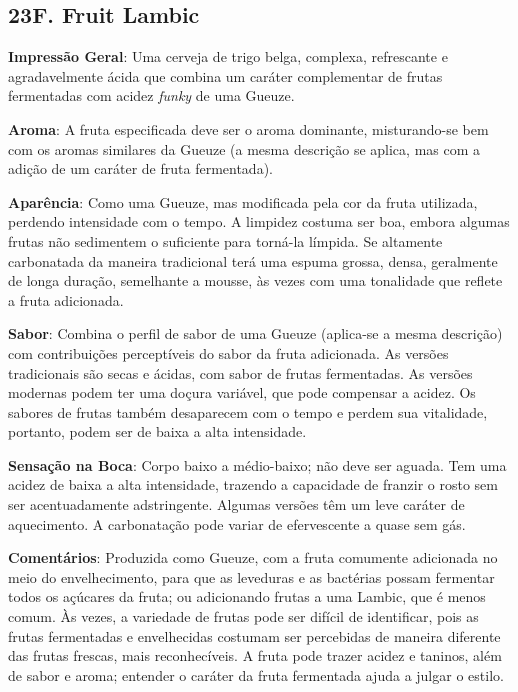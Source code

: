 \subsection*{23F. Fruit Lambic}
\textbf{Impressão Geral}: Uma cerveja de trigo belga, complexa, refrescante e agradavelmente ácida que combina um caráter complementar de frutas fermentadas com acidez \textit{funky} de uma Gueuze.

\textbf{Aroma}: A fruta especificada deve ser o aroma dominante, misturando-se bem com os aromas similares da Gueuze (a mesma descrição se aplica, mas com a adição de um caráter de fruta fermentada).

\textbf{Aparência}: Como uma Gueuze, mas modificada pela cor da fruta utilizada, perdendo intensidade com o tempo. A limpidez costuma ser boa, embora algumas frutas não sedimentem o suficiente para torná-la límpida. Se altamente carbonatada da maneira tradicional terá uma espuma grossa, densa, geralmente de longa duração, semelhante a mousse, às vezes com uma tonalidade que reflete a fruta adicionada.

\textbf{Sabor}: Combina o perfil de sabor de uma Gueuze (aplica-se a mesma descrição) com contribuições perceptíveis do sabor da fruta adicionada. As versões tradicionais são secas e ácidas, com sabor de frutas fermentadas. As versões modernas podem ter uma doçura variável, que pode compensar a acidez. Os sabores de frutas também desaparecem com o tempo e perdem sua vitalidade, portanto, podem ser de baixa a alta intensidade.

\textbf{Sensação na Boca}: Corpo baixo a médio-baixo; não deve ser aguada. Tem uma acidez de baixa a alta intensidade, trazendo a capacidade de franzir o rosto sem ser acentuadamente adstringente. Algumas versões têm um leve caráter de aquecimento. A carbonatação pode variar de efervescente a quase sem gás.

\textbf{Comentários}: Produzida como Gueuze, com a fruta comumente adicionada no meio do envelhecimento, para que as leveduras e as bactérias possam fermentar todos os açúcares da fruta; ou adicionando frutas a uma Lambic, que é menos comum. Às vezes, a variedade de frutas pode ser difícil de identificar, pois as frutas fermentadas e envelhecidas costumam ser percebidas de maneira diferente das frutas frescas, mais reconhecíveis. A fruta pode trazer acidez e taninos, além de sabor e aroma; entender o caráter da fruta fermentada ajuda a julgar o estilo.

